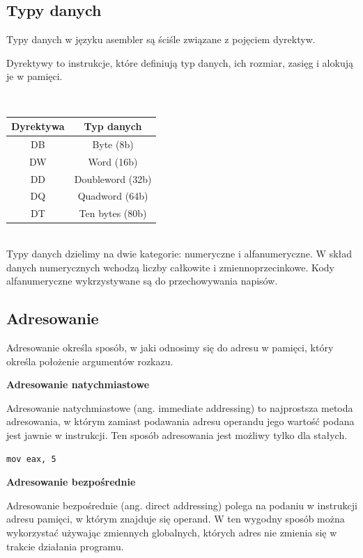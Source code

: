 \documentclass[a4paper,12pt]{article}
\begin{document}
\subsection{Typy danych}

Typy danych w języku asembler są ściśle związane z pojęciem dyrektyw.

Dyrektywy to instrukcje, które definiują typ danych, ich rozmiar, zasięg i alokują je w pamięci.

\\
\begin{center}
\begin{tabular}{|c|c|}
\hline 
Dyrektywa & Typ danych \\ 
\hline 
DB & Byte (8b) \\ 
\hline 
DW & Word (16b) \\ 
\hline 
DD & Doubleword (32b) \\ 
\hline 
DQ & Quadword (64b) \\ 
\hline 
DT & Ten bytes (80b) \\ 
\hline 
\end{tabular} 
\end{center}
\\

Typy danych dzielimy na dwie kategorie: numeryczne i alfanumeryczne. W skład danych numerycznych wchodzą liczby całkowite i zmiennoprzecinkowe. Kody alfanumeryczne wykrzystywane są do przechowywania napisów.

\subsection{Adresowanie}

Adresowanie określa sposób, w jaki odnosimy się do adresu w pamięci, który określa położenie argumentów rozkazu.

\textbf{Adresowanie natychmiastowe}

Adresowanie natychmiastowe (ang. immediate addressing) to najprostsza metoda adresowania, w którym zamiast podawania adresu operandu jego wartość podana jest jawnie w instrukcji. Ten sposób adresowania jest możliwy tylko dla stałych.

\begin{lstlisting}[numbers=none, xleftmargin=0]
mov eax, 5
\end{lstlisting}

\textbf{Adresowanie bezpośrednie}

Adresowanie bezpośrednie (ang. direct addressing) polega na podaniu w instrukcji adresu pamięci, w którym znajduje się operand. W ten wygodny sposób można wykorzystać używając zmiennych globalnych, których adres nie zmienia się w trakcie działania programu.
\end{document}
